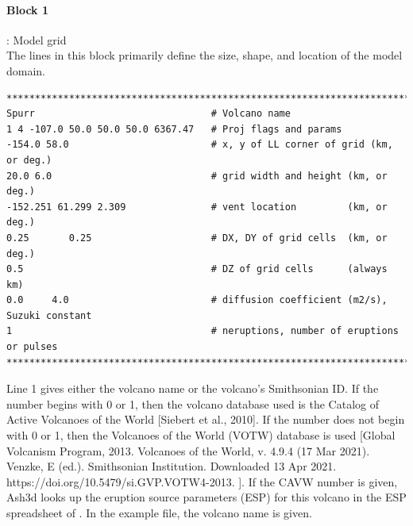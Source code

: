 \paragraph{Block 1}: Model grid\\
The lines in this block primarily define the size, shape,
and location of the model domain.
\small
\begin{verbatim}
*******************************************************************************
Spurr                               # Volcano name
1 4 -107.0 50.0 50.0 50.0 6367.47   # Proj flags and params
-154.0 58.0                         # x, y of LL corner of grid (km, or deg.)
20.0 6.0                            # grid width and height (km, or deg.)
-152.251 61.299 2.309               # vent location         (km, or deg.)
0.25       0.25                     # DX, DY of grid cells  (km, or deg.)
0.5                                 # DZ of grid cells      (always km)
0.0     4.0                         # diffusion coefficient (m2/s), Suzuki constant
1                                   # neruptions, number of eruptions or pulses
*******************************************************************************
\end{verbatim}
\normalsize

Line 1 gives either the volcano name or the volcano’s Smithsonian ID.
If the number begins with 0 or 1, then the volcano database used is
the Catalog of Active Volcanoes of the World [Siebert et al., 2010].
If the number does not begin with 0 or 1, then the Volcanoes of the
World (VOTW) database is used
[Global Volcanism Program, 2013. Volcanoes of the World, v. 4.9.4 (17 Mar 2021).
Venzke, E (ed.). Smithsonian Institution.
Downloaded 13 Apr 2021. https://doi.org/10.5479/si.GVP.VOTW4-2013. ].
If the CAVW number is given, Ash3d looks up the eruption source
parameters (ESP) for this volcano in the ESP spreadsheet of
\cite{Mastin09a}. In the example file, the volcano name
is given.

